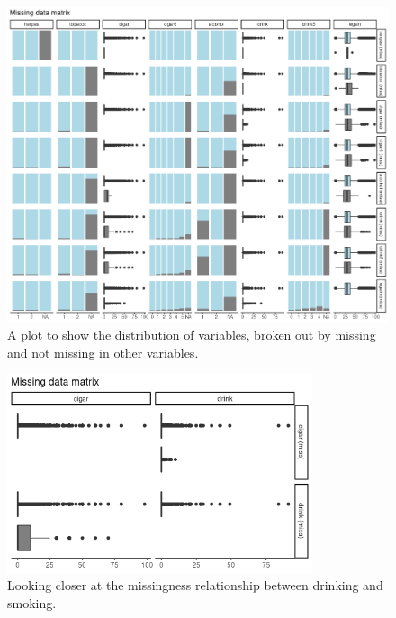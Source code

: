 \documentclass[12pt]{article}
\begin{document}
\begin{figure}[h!]
\centering
\includegraphics[width=\textwidth]{2b-missing_plots.png}
\caption{A plot to show the distribution of variables, broken out by missing and not missing in other variables.}
\label{fig-2b1}
\end{figure}

\begin{figure}[h!]
\centering
\includegraphics[width=0.8\textwidth]{2b-missing_plots_cigar-vs-drink.png}
\caption{Looking closer at the missingness relationship between drinking and smoking.}
\label{fig-2b2}
\end{figure}



\vem
{}
\end{document}

